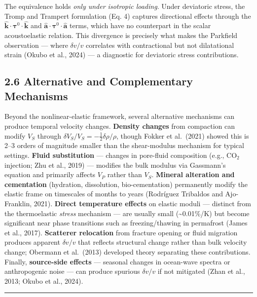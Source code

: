 \documentclass[12pt]{article}
\begin{document}
The equivalence holds \emph{only under isotropic loading}. Under
deviatoric stress, the Tromp and Trampert formulation (Eq. 4) captures
directional effects through the
\(\hat{\mathbf{k}} \cdot \boldsymbol{\tau}^0 \cdot \hat{\mathbf{k}}\)
and
\(\hat{\mathbf{a}} \cdot \boldsymbol{\tau}^0 \cdot \hat{\mathbf{a}}\)
terms, which have no counterpart in the scalar acoustoelastic relation.
This divergence is precisely what makes the Parkfield observation ---
where \(\delta v/v\) correlates with contractional but not dilatational
strain (Okubo et al., 2024) --- a diagnostic for deviatoric stress
contributions.

\subsection{2.6 Alternative and Complementary
Mechanisms}\label{alternative-and-complementary-mechanisms}

Beyond the nonlinear-elastic framework, several alternative mechanisms
can produce temporal velocity changes. \textbf{Density changes} from
compaction can modify \(V_S\) through
\(\delta V_S/V_S = -\frac{1}{2}\delta\rho/\rho\), though Fokker et
al.~(2021) showed this is 2--3 orders of magnitude smaller than the
shear-modulus mechanism for typical settings. \textbf{Fluid
substitution} --- changes in pore-fluid composition (e.g., CO\(_2\)
injection; Zhu et al., 2019) --- modifies the bulk modulus via
Gassmann's equation and primarily affects \(V_P\) rather than \(V_S\).
\textbf{Mineral alteration and cementation} (hydration, dissolution,
bio-cementation) permanently modify the elastic frame on timescales of
months to years (Rodríguez Tribaldos and Ajo-Franklin, 2021).
\textbf{Direct temperature effects} on elastic moduli --- distinct from
the thermoelastic \emph{stress} mechanism --- are usually small
(\textasciitilde{}0.01\%/K) but become significant near phase
transitions such as freezing/thawing in permafrost (James et al., 2017).
\textbf{Scatterer relocation} from fracture opening or fluid migration
produces apparent \(\delta v/v\) that reflects structural change rather
than bulk velocity change; Obermann et al.~(2013) developed theory
separating these contributions. Finally, \textbf{source-side effects}
--- seasonal changes in ocean-wave spectra or anthropogenic noise ---
can produce spurious \(\delta v/v\) if not mitigated (Zhan et al., 2013;
Okubo et al., 2024).

\begin{center}\rule{0.5\linewidth}{0.5pt}\end{center}
\end{document}
